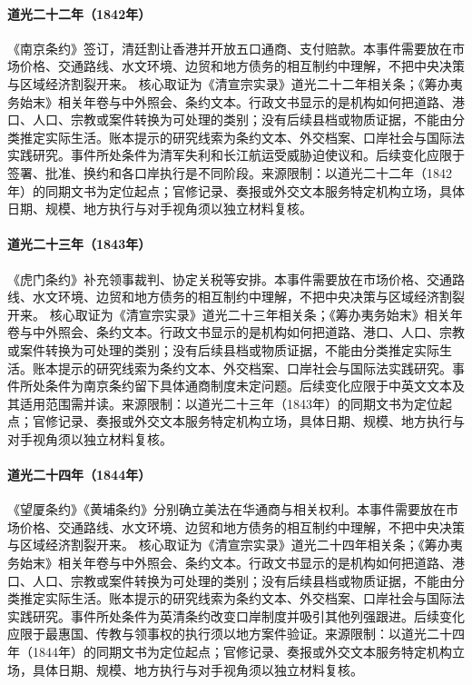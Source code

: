 \hypertarget{civic:EQ-1842-NANJING-TREATY}{}\paragraph{道光二十二年（1842年）}《南京条约》签订，清廷割让香港并开放五口通商、支付赔款。本事件需要放在市场价格、交通路线、水文环境、边贸和地方债务的相互制约中理解，不把中央决策与区域经济割裂开来。 核心取证为《清宣宗实录》道光二十二年相关条；《筹办夷务始末》相关年卷与中外照会、条约文本。行政文书显示的是机构如何把道路、港口、人口、宗教或案件转换为可处理的类别；没有后续县档或物质证据，不能由分类推定实际生活。账本提示的研究线索为条约文本、外交档案、口岸社会与国际法实践研究。事件所处条件为清军失利和长江航运受威胁迫使议和。后续变化应限于签署、批准、换约和各口岸执行是不同阶段。来源限制：以道光二十二年（1842年）的同期文书为定位起点；官修记录、奏报或外交文本服务特定机构立场，具体日期、规模、地方执行与对手视角须以独立材料复核。
\hypertarget{civic:EQ-1843-BOGUE-TREATY}{}\paragraph{道光二十三年（1843年）}《虎门条约》补充领事裁判、协定关税等安排。本事件需要放在市场价格、交通路线、水文环境、边贸和地方债务的相互制约中理解，不把中央决策与区域经济割裂开来。 核心取证为《清宣宗实录》道光二十三年相关条；《筹办夷务始末》相关年卷与中外照会、条约文本。行政文书显示的是机构如何把道路、港口、人口、宗教或案件转换为可处理的类别；没有后续县档或物质证据，不能由分类推定实际生活。账本提示的研究线索为条约文本、外交档案、口岸社会与国际法实践研究。事件所处条件为南京条约留下具体通商制度未定问题。后续变化应限于中英文文本及其适用范围需并读。来源限制：以道光二十三年（1843年）的同期文书为定位起点；官修记录、奏报或外交文本服务特定机构立场，具体日期、规模、地方执行与对手视角须以独立材料复核。
\hypertarget{civic:EQ-1844-WANGXIA-WHAMPOA-TREATIES}{}\paragraph{道光二十四年（1844年）}《望厦条约》《黄埔条约》分别确立美法在华通商与相关权利。本事件需要放在市场价格、交通路线、水文环境、边贸和地方债务的相互制约中理解，不把中央决策与区域经济割裂开来。 核心取证为《清宣宗实录》道光二十四年相关条；《筹办夷务始末》相关年卷与中外照会、条约文本。行政文书显示的是机构如何把道路、港口、人口、宗教或案件转换为可处理的类别；没有后续县档或物质证据，不能由分类推定实际生活。账本提示的研究线索为条约文本、外交档案、口岸社会与国际法实践研究。事件所处条件为英清条约改变口岸制度并吸引其他列强跟进。后续变化应限于最惠国、传教与领事权的执行须以地方案件验证。来源限制：以道光二十四年（1844年）的同期文书为定位起点；官修记录、奏报或外交文本服务特定机构立场，具体日期、规模、地方执行与对手视角须以独立材料复核。
